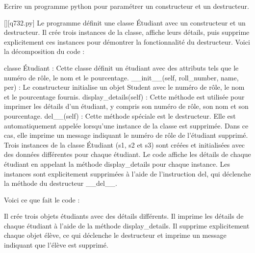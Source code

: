         \question
        Ecrire un programme python pour paramétrer un constructeur et un destructeur.
        \par
        \begin{solution}
            \renewcommand{\nomfichier}{q732.py}
            \pythonfile{\chemincode \nomfichier}[][\nomfichier]
            Le programme définit une classe Étudiant avec un constructeur et un destructeur. Il crée trois instances de la classe, affiche leurs détails, puis supprime explicitement ces instances pour démontrer la fonctionnalité du destructeur. Voici la décomposition du code :

    classe Étudiant : Cette classe définit un étudiant avec des attributs tels que le numéro de rôle, le nom et le pourcentage.
    __init__(self, roll_number, name, per) : Le constructeur initialise un objet Student avec le numéro de rôle, le nom et le pourcentage fournis.
    display_details(self) : Cette méthode est utilisée pour imprimer les détails d'un étudiant, y compris son numéro de rôle, son nom et son pourcentage.
    del__(self) : Cette méthode spéciale est le destructeur. Elle est automatiquement appelée lorsqu'une instance de la classe est supprimée. Dans ce cas, elle imprime un message indiquant le numéro de rôle de l'étudiant supprimé.
    Trois instances de la classe Étudiant (s1, s2 et s3) sont créées et initialisées avec des données différentes pour chaque étudiant.
    Le code affiche les détails de chaque étudiant en appelant la méthode display_details pour chaque instance.
    Les instances sont explicitement supprimées à l'aide de l'instruction del, qui déclenche la méthode du destructeur __del__.

Voici ce que fait le code :

    Il crée trois objets étudiants avec des détails différents.
    Il imprime les détails de chaque étudiant à l'aide de la méthode display_details.
    Il supprime explicitement chaque objet élève, ce qui déclenche le destructeur et imprime un message indiquant que l'élève est supprimé.
        \end{solution}
        

